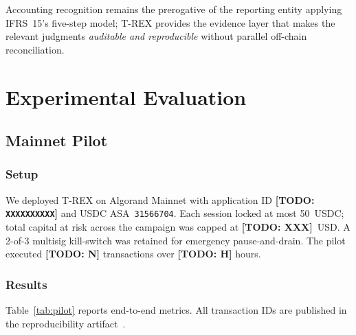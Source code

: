 \documentclass[journal]{IEEEtran}
\newcommand{\TODO}[1]{{\color{red}\textbf{[TODO: #1]}}}
\begin{document}
\begin{table}[h]
\centering
\caption{T-REX events as audit evidence}
\label{tab:ifrs}
\end{table}

\noindent Accounting recognition remains the prerogative of the reporting entity applying IFRS~15's five-step model; T-REX provides the evidence layer that makes the relevant judgments \emph{auditable and reproducible} without parallel off-chain reconciliation.

\section{Experimental Evaluation}
\label{sec:evaluation}

\subsection{Mainnet Pilot}
\label{sec:pilot}

\subsubsection{Setup}
We deployed T-REX on Algorand Mainnet with application ID \TODO{\texttt{XXXXXXXXXX}} and USDC ASA~\texttt{31566704}. Each session locked at most 50~USDC; total capital at risk across the campaign was capped at \TODO{XXX}~USD. A 2-of-3 multisig kill-switch was retained for emergency pause-and-drain. The pilot executed \TODO{N} transactions over \TODO{H} hours.

\subsubsection{Results}
Table~\ref{tab:pilot} reports end-to-end metrics. All transaction IDs are published in the reproducibility artifact~\cite{artifact}.
\end{document}
